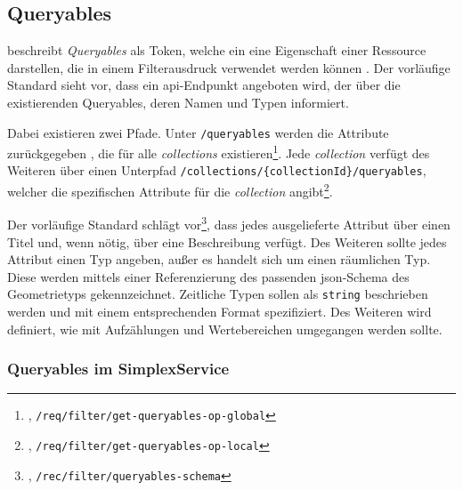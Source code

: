 \newcommand{\rfqsfn}{\footnote{\textcite{ogcFiltering}, \texttt{/rec/filter/queryables-schema}}}
\newcommand{\rfgqog}{\footnote{\textcite{ogcFiltering}, \texttt{/req/filter/get-queryables-op-global}}}
\newcommand{\rfgqol}{\footnote{\textcite{ogcFiltering}, \texttt{/req/filter/get-queryables-op-local}}}

\subsection{Queryables}
\label{sec:queryables}

 beschreibt \textit{Queryables} als Token, welche ein eine Eigenschaft einer
Ressource darstellen, die in einem Filterausdruck verwendet werden können
. Der vorläufige Standard sieht vor, dass ein \ac{api}-Endpunkt
angeboten wird, der über die existierenden Queryables, deren Namen und Typen informiert.

Dabei existieren zwei Pfade. Unter \texttt{/queryables} werden die Attribute zurückgegeben , die für
alle \textit{collections} existieren\rfgqog. Jede \textit{collection} verfügt des Weiteren über einen
Unterpfad \texttt{/collections/\{collectionId\}/queryables}, welcher die spezifischen Attribute für
die \textit{collection} angibt\rfgqol.

Der vorläufige Standard schlägt vor\rfqsfn, dass jedes ausgelieferte Attribut über einen Titel und,
wenn nötig, über eine Beschreibung verfügt. Des Weiteren sollte jedes Attribut einen Typ angeben,
außer es handelt sich um einen räumlichen Typ. Diese werden mittels einer Referenzierung des
passenden \ac{json}-Schema des Geometrietyps gekennzeichnet. Zeitliche Typen sollen als
\texttt{string} beschrieben werden und mit einem entsprechenden Format spezifiziert. Des Weiteren
wird definiert, wie mit Aufzählungen und Wertebereichen umgegangen werden sollte.

\subsubsection{Queryables im SimplexService}





